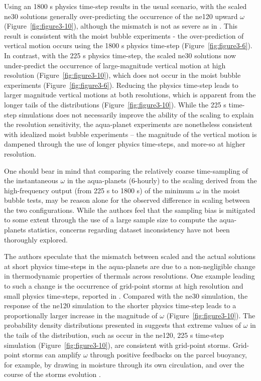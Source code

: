 Using an 1800 s physics time-step results in the usual scenario, with the scaled ne30 solutions generally over-predicting the occurrence of the ne120 upward  $\omega$ (Figure~\ref{fig:figure3-10}), although the mismatch is not as severe as in \cite{HR2017JCLIM}. This result is consistent with the moist bubble experiments - the over-prediction of vertical motion occurs using the 1800 s physics time-step (Figure~\ref{fig:figure3-6}). In contrast, with the 225 s physics time-step, the scaled ne30 solutions now under-predict the occurrence of large-magnitude vertical motion at high resolution (Figure~\ref{fig:figure3-10}), which does not occur in the moist bubble experiments (Figure~\ref{fig:figure3-6}). Reducing the physics time-step leads to larger magnitude vertical motions at both resolutions, which is apparent from the longer tails of the distributions (Figure~\ref{fig:figure3-10}). While the 225 s time-step simulations does not necessarily improve the ability of the scaling to explain the resolution sensitivity, the aqua-planet experiments are nonetheless consistent with idealized moist bubble experiments – the magnitude of the vertical motion is dampened through the use of longer physics time-steps, and more-so at higher resolution. 

One should bear in mind that comparing the relatively coarse time-sampling of the instantaneous $\omega$ in the aqua-planets (6-hourly) to the scaling derived from the high-frequency output (from 225 s to 1800 s) of the minimum $\omega$ in the moist bubble tests, may be reason alone for the observed difference in scaling between the two configurations. While the authors feel that the sampling bias is mitigated to some extent through the use of a large sample size to compute the aqua-planets statistics, concerns regarding dataset inconsistency have not been thoroughly explored.

The authors speculate that the mismatch between scaled and the actual solutions at short physics time-steps in the aqua-planets are due to a non-negligible change in thermodynamic properties of thermals across resolutions. One example leading to such a change is the occurrence of grid-point storms at high resolution and small physics time-steps, reported in \cite{W2013QJRMS}. Compared with the ne30 simulation, the response of the ne120 simulation to the shorter physics time-step leads to a proportionally larger increase in the magnitude of $\omega$ (Figure~\ref{fig:figure3-10}). The probability density distributions presented in \cite{W2013QJRMS} suggests that extreme values of $\omega$ in the tails of the distribution, such as occur in the ne120, 225 s time-step simulation (Figure~\ref{fig:figure3-10}), are consistent with grid-point storms. Grid-point storms can amplify $\omega$ through positive feedbacks on the parcel buoyancy, for example, by drawing in moisture through its own circulation, and over the course of the storms evolution \citep{W2013QJRMS}.

